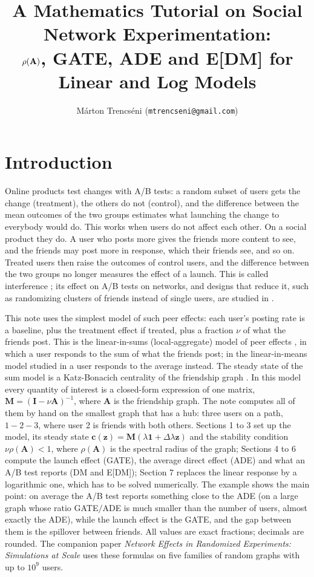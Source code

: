 \documentclass[11pt]{article}
\title{A Mathematics Tutorial on Social Network Experimentation:\\ $\rho(\mA)$, GATE, ADE and E[DM] for Linear and Log Models}
\author{M\'arton Trencs\'eni (\texttt{mtrencseni@gmail.com})}
\date{}
\newcommand{\one}{\mathbf{1}}
\newcommand{\vc}{\boldsymbol{c}}
\newcommand{\vz}{\boldsymbol{z}}
\newcommand{\mA}{\mathbf{A}}
\newcommand{\mM}{\mathbf{M}}
\newcommand{\mI}{\mathbf{I}}
\begin{document}
\maketitle\vspace{-4ex}

\section*{Introduction}

Online products test changes with A/B tests: a random subset of users gets the change (treatment), the others do not (control), and the difference between the mean outcomes of the two groups estimates what launching the change to everybody would do.  This works when users do not affect each other.  On a social product they do.  A user who posts more gives the friends more content to see, and the friends may post more in response, which their friends see, and so on.  Treated users then raise the outcomes of control users, and the difference between the two groups no longer measures the effect of a launch.  This is called interference \cite{hudgens2008}; its effect on A/B tests on networks, and designs that reduce it, such as randomizing clusters of friends instead of single users, are studied in \cite{ugander2013,aronow2017,eckles2017,savje2021}.

This note uses the simplest model of such peer effects: each user's posting rate is a baseline, plus the treatment effect if treated, plus a fraction $\nu$ of what the friends post.  This is the linear-in-sums (local-aggregate) model of peer effects \cite{ballester2006}, in which a user responds to the sum of what the friends post; in the linear-in-means model studied in \cite{manski1993,bramoulle2009} a user responds to the average instead.  The steady state of the sum model is a Katz-Bonacich centrality of the friendship graph \cite{katz1953,bonacich1987}.  In this model every quantity of interest is a closed-form expression of one matrix, $\mM = (\mI - \nu\mA)^{-1}$, where $\mA$ is the friendship graph.  The note computes all of them by hand on the smallest graph that has a hub: three users on a path, $1 - 2 - 3$, where user 2 is friends with both others.  Sections 1 to 3 set up the model, its steady state $\vc(\vz) = \mM(\lambda\one + \Delta\lambda\vz)$ and the stability condition $\nu\rho(\mA) < 1$, where $\rho(\mA)$ is the spectral radius of the graph; Sections 4 to 6 compute the launch effect (GATE), the average direct effect (ADE) and what an A/B test reports (DM and E[DM]); Section 7 replaces the linear response by a logarithmic one, which has to be solved numerically.
The example shows the main point: on average the A/B test reports something close to the ADE (on a large graph whose ratio GATE$/$ADE is much smaller than the number of users, almost exactly the ADE), while the launch effect is the GATE, and the gap between them is the spillover between friends.  All values are exact fractions; decimals are rounded.  The companion paper \emph{Network Effects in Randomized Experiments: Simulations at Scale} uses these formulas on five families of random graphs with up to $10^9$ users.
\end{document}
